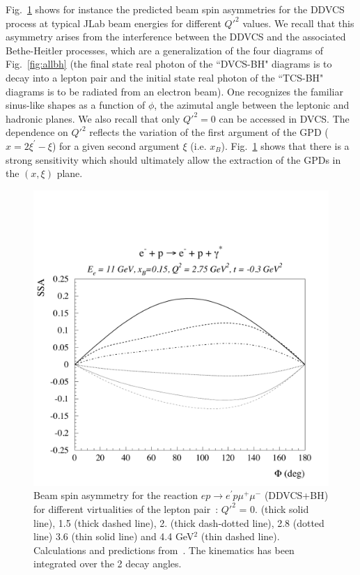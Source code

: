 Fig.~\ref{fig:asym_ddvcs} shows for instance the predicted beam spin asymmetries
for the DDVCS process at typical JLab beam energies for different $Q'^2$
values. We recall that this asymmetry arises
from the interference between the DDVCS and the associated Bethe-Heitler 
processes, which are a generalization of the four diagrams of Fig.~\ref{fig:allbh} 
(the final state real photon of the ``DVCS-BH" diagrams is to decay
into a lepton pair and the initial state real photon of the ``TCS-BH" diagrams
is to be radiated from an electron beam). One recognizes the familiar
sinus-like shapes as a function of $\phi$, the azimutal angle
between the leptonic and hadronic planes.
We also recall that only $Q'^2=0$ can be accessed in DVCS.
The dependence on $Q'^2$ reflects the variation of the first argument
of the GPD ($x=2\xi^\prime-\xi$) for a given second argument $\xi$ (i.e. $x_B$).
Fig.~\ref{fig:asym_ddvcs} shows that there is a strong sensitivity 
which should ultimately allow the extraction of the GPDs in the $(x,\xi)$ plane.

\begin{figure}[htbp]
\begin{center} 
\includegraphics[width=1\textwidth]{asymm_ddvcs.pdf}
\caption{Beam spin asymmetry for the reaction $ep\to e^\prime p\mu^+\mu^-$ (DDVCS+BH) 
for different virtualities of the lepton pair~:
$Q'^2$ = 0. (thick solid line), 1.5 (thick dashed line), 2. (thick dash-dotted line), 2.8 (dotted line)
3.6 (thin solid line) and 4.4 GeV$^2$ (thin dashed line). Calculations and predictions 
from~\cite{Guidal:2002kt}. The kinematics has been integrated over the
2 decay angles.}
\label{fig:asym_ddvcs}
\end{center}
\end{figure}

